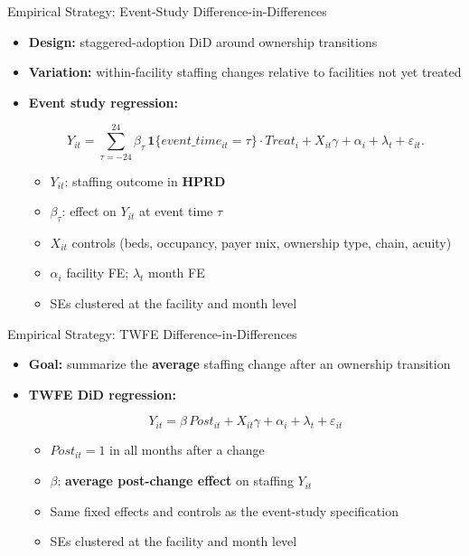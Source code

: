 \documentclass{beamer}
\begin{document}
\begin{frame}[t]{Empirical Strategy: Event-Study Difference-in-Differences}

\small
\begin{itemize}
	\item \textbf{Design:} staggered-adoption DiD around ownership transitions \citep{goodman_bacon_2021}
	\item \textbf{Variation:} within-facility staffing changes relative to facilities not yet treated
	\vspace{0.35em}
	\item \textbf{Event study regression:}
	
	\pause
	
	\[
	Y_{it} =
	\sum_{\tau=-24}^{24} \beta_{\tau}\,\mathbf{1}\{event\_time_{it}=\tau\}\cdot Treat_i
	+ X_{it}\gamma + \alpha_i + \lambda_t + \varepsilon_{it}.
	\]
  
	\vspace{0.2em}
	
	\begin{itemize}
		\item $Y_{it}$: staffing outcome in \textbf{HPRD}
		\item $\beta_{\tau}$: effect on $Y_{it}$ at event time $\tau$
		\item $X_{it}$ controls (beds, occupancy, payer mix, ownership type, chain, acuity)
		\item $\alpha_i$ facility FE; $\lambda_t$ month FE
		\item SEs clustered at the facility and month level
	\end{itemize}

\end{itemize}
\end{frame}

\begin{frame}[t]{Empirical Strategy: TWFE Difference-in-Differences}

\small
\begin{itemize}
	\item \textbf{Goal:} summarize the \textbf{average} staffing change after an ownership transition
	\vspace{0.35em}
	\item \textbf{TWFE DiD regression:}
	
	\[
	Y_{it}=\beta\,Post_{it} + X_{it}\gamma + \alpha_i + \lambda_t + \varepsilon_{it}
	\]
	
	\vspace{0.2em}

	\begin{itemize}
		\item $Post_{it}=1$ in all months after a change
		\item $\beta$: \textbf{average post-change effect} on staffing $Y_{it}$
		\item Same fixed effects and controls as the event-study specification
		\item SEs clustered at the facility and month level
	\end{itemize}
	
\end{itemize}
\end{frame}
\end{document}

